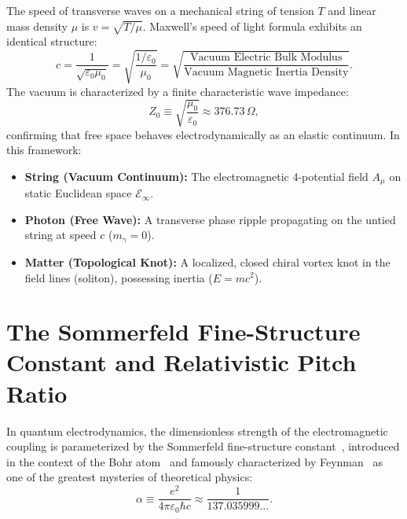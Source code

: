 \documentclass[11pt,a4paper]{article}
\begin{document}
The speed of transverse waves on a mechanical string of tension $T$ and linear mass density $\mu$ is $v = \sqrt{T/\mu}$. Maxwell's speed of light formula exhibits an identical structure:
\begin{equation}
    c = \frac{1}{\sqrt{\varepsilon_0 \mu_0}} = \sqrt{\frac{1/\varepsilon_0}{\mu_0}} = \sqrt{\frac{\text{Vacuum Electric Bulk Modulus}}{\text{Vacuum Magnetic Inertia Density}}}.
    \label{eq:vakum_tel_ozdeslik_p2}
\end{equation}
The vacuum is characterized by a finite characteristic wave impedance:
\begin{equation}
    Z_0 \equiv \sqrt{\frac{\mu_0}{\varepsilon_0}} \approx 376.73\,\Omega,
    \label{eq:vakum_empedansi_tanim_p2}
\end{equation}
confirming that free space behaves electrodynamically as an elastic continuum. In this framework:
\begin{itemize}
    \item \textbf{String (Vacuum Continuum):} The electromagnetic 4-potential field $A_\mu$ on static Euclidean space $\mathcal{E}_\infty$.
    \item \textbf{Photon (Free Wave):} A transverse phase ripple propagating on the untied string at speed $c$ ($m_\gamma = 0$).
    \item \textbf{Matter (Topological Knot):} A localized, closed chiral vortex knot in the field lines (soliton), possessing inertia ($E = mc^2$).
\end{itemize}

\section{The Sommerfeld Fine-Structure Constant and Relativistic Pitch Ratio}
\label{sec:ince_yapi}

In quantum electrodynamics, the dimensionless strength of the electromagnetic coupling is parameterized by the Sommerfeld fine-structure constant~\cite{sommerfeld1916}, introduced in the context of the Bohr atom~\cite{bohr1913} and famously characterized by Feynman~\cite{feynman1985} as one of the greatest mysteries of theoretical physics:
\begin{equation}
    \alpha \equiv \frac{e^2}{4\pi \varepsilon_0 \hbar c} \approx \frac{1}{137.035999...}.
    \label{eq:alpha_tanim}
\end{equation}
\end{document}
